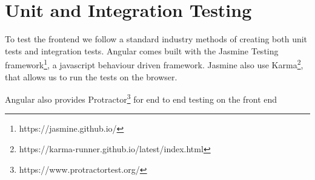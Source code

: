 \section{Unit and Integration Testing}
To test the frontend we follow a standard industry methods of creating both unit tests and integration tests. Angular comes built with the Jasmine Testing framework\footnote{https://jasmine.github.io/}, a javascript behaviour driven framework. Jasmine also use Karma\footnote{https://karma-runner.github.io/latest/index.html}, that allows us to run the tests on the browser.

Angular also provides Protractor\footnote{https://www.protractortest.org/} for end to end testing on the front end